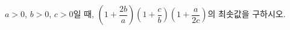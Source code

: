 $a>0$, $b>0$, $c>0$일 때, $\left(1+\dfrac{2b}{a}\right)\left(1+\dfrac{c}{b}\right)\left(1+\dfrac{a}{2c}\right)$의 최솟값을 구하시오.

